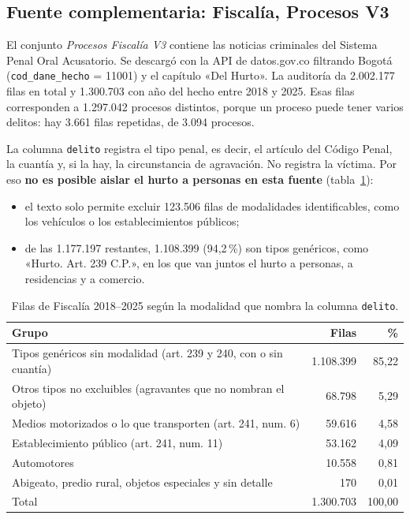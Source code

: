 \subsection{Fuente complementaria: Fiscalía, Procesos V3}

El conjunto \emph{Procesos Fiscalía V3} contiene las noticias criminales del Sistema Penal Oral Acusatorio. Se descargó con la API de datos.gov.co filtrando Bogotá (\texttt{cod\_dane\_hecho} = 11001) y el capítulo «Del Hurto». La auditoría da 2.002.177 filas en total y 1.300.703 con año del hecho entre 2018 y 2025. Esas filas corresponden a 1.297.042 procesos distintos, porque un proceso puede tener varios delitos: hay 3.661 filas repetidas, de 3.094 procesos.

La columna \texttt{delito} registra el tipo penal, es decir, el artículo del Código Penal, la cuantía y, si la hay, la circunstancia de agravación. No registra la víctima. Por eso \textbf{no es posible aislar el hurto a personas en esta fuente} (tabla~\ref{tab:fiscalia}):
\begin{itemize}
  \item el texto solo permite excluir 123.506 filas de modalidades identificables, como los vehículos o los establecimientos públicos;
  \item de las 1.177.197 restantes, 1.108.399 (94,2\,\%) son tipos genéricos, como «Hurto. Art. 239 C.P.», en los que van juntos el hurto a personas, a residencias y a comercio.
\end{itemize}

\begin{table}[H]
\centering
\small
\caption{Filas de Fiscalía 2018--2025 según la modalidad que nombra la columna \texttt{delito}.}\label{tab:fiscalia}
\begin{tabularx}{\textwidth}{@{}Xrr@{}}
\toprule
\textbf{Grupo} & \textbf{Filas} & \textbf{\%} \\
\midrule
Tipos genéricos sin modalidad (art. 239 y 240, con o sin cuantía) & 1.108.399 & 85,22 \\
Otros tipos no excluibles (agravantes que no nombran el objeto) & 68.798 & 5,29 \\
Medios motorizados o lo que transporten (art. 241, num. 6) & 59.616 & 4,58 \\
Establecimiento público (art. 241, num. 11) & 53.162 & 4,09 \\
Automotores & 10.558 & 0,81 \\
Abigeato, predio rural, objetos especiales y sin detalle & 170 & 0,01 \\
\midrule
Total & 1.300.703 & 100,00 \\
\bottomrule
\end{tabularx}
\end{table}

